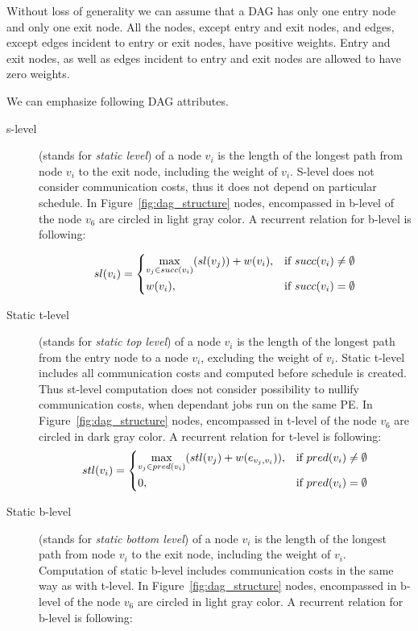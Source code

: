 Without loss of generality we can assume that a DAG has only one entry
node and only one exit node. All the nodes, except entry and exit
nodes, and edges, except edges incident to entry or exit nodes, have
positive weights. Entry and exit nodes, as well as edges incident to
entry and exit nodes are allowed to have zero weights.

We can emphasize following DAG attributes.

\begin{description}
\item[s-level] (stands for \emph{static level}) of a node $v_i$ is the
  length of the longest path from node $v_i$ to the exit node,
  including the weight of $v_i$. S-level does not consider
  communication costs, thus it does not depend on particular
  schedule. In Figure~\ref{fig:dag_structure} nodes, encompassed in
  b-level of the node $v_6$ are circled in light gray color. A
  recurrent relation for b-level is following:

\[
sl(v_i) =
  \begin{dcases}
    \max_{v_j \in succ(v_i)}(sl(v_j)) + w(v_i),& \text{if } succ(v_i) \neq \emptyset\\
    w(v_i), & \text{if } succ(v_i) = \emptyset
  \end{dcases}
\]

\item[Static t-level] (stands for \emph{static top level}) of a node
  $v_i$ is the length of the longest path from the entry node to a
  node $v_i$, excluding the weight of $v_i$. Static t-level includes
  all communication costs and computed before schedule is
  created. Thus st-level computation does not consider possibility to
  nullify communication costs, when dependant jobs run on the same
  PE. In Figure~\ref{fig:dag_structure} nodes, encompassed in t-level
  of the node $v_6$ are circled in dark gray color. A recurrent
  relation for t-level is following:
\[
stl(v_i) =
  \begin{dcases}
    \max_{v_j \in pred(v_i)}(stl(v_j) + w(e_{v_j,v_i})),& \text{if } pred(v_i) \neq \emptyset\\
    0, & \text{if } pred(v_i) = \emptyset
  \end{dcases}
\]

\item[Static b-level] (stands for \emph{static bottom level}) of a
  node $v_i$ is the length of the longest path from node $v_i$ to the
  exit node, including the weight of $v_i$. Computation of static
  b-level includes communication costs in the same way as with
  t-level. In Figure~\ref{fig:dag_structure} nodes, encompassed in
  b-level of the node $v_6$ are circled in light gray color. A
  recurrent relation for b-level is following:


\end{description}

